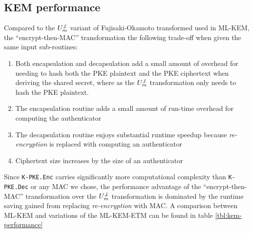 \documentclass[journal=tches,submission]{iacrtrans}
\newcommand{\encrypt}{\texttt{Enc}}
\newcommand{\decrypt}{\texttt{Dec}}
\begin{document}
\subsection{KEM performance}
Compared to the $U^{\not\bot}_m$ variant of Fujisaki-Okamoto transformed used in ML-KEM, the ``encrypt-then-MAC'' transformation the following trade-off when given the same input sub-routines: \begin{enumerate}
    \item Both encapsulation and decapsulation add a small amount of overhead for needing to hash both the PKE plaintext and the PKE ciphertext when deriving the shared secret, where as the $U^{\not\bot}_m$ transformation only needs to hash the PKE plaintext.
    \item The encapsulation routine adds a small amount of run-time overhead for computing the authenticator
    \item The decapsulation routine enjoys substantial runtime speedup because \emph{re-encryption} is replaced with computing an authenticator
    \item Ciphertext size increases by the size of an authenticator
\end{enumerate}

Since \texttt{K-PKE.\encrypt} carries significantly more computational complexity than \texttt{K-PKE.\decrypt} or any MAC we chose, the performance advantage of the ``encrypt-then-MAC'' transformation over the $U^{\not\bot}_m$ transformation is dominated by the runtime saving gained from replacing \emph{re-encryption} with MAC. A comparison between ML-KEM and variations of the ML-KEM-ETM can be found in table \ref{tbl:kem-performance}

\end{document}
